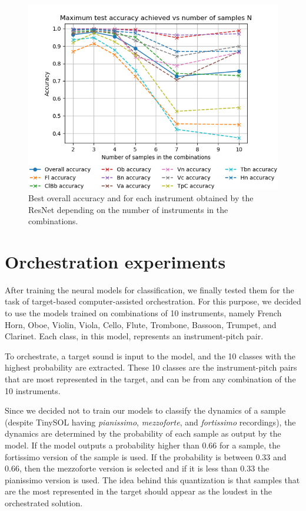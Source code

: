 \documentclass{article}
\begin{document}
\begin{figure}
\begin{center}
\includegraphics[scale=0.40]{figs/Acc_vs_N_ResNet.png}
\caption{Best overall accuracy and for each instrument obtained by the ResNet depending on the number of instruments in the combinations. \label{best_acc_resnet}}
\end{center}
\end{figure}

\section{Orchestration experiments}
\label{sec:orchestration}

After training the neural models for classification, we finally tested them for the task of target-based computer-assisted orchestration. For this purpose, we decided to use the models trained on combinations of 10 instruments, namely French Horn, Oboe, Violin, Viola, Cello, Flute, Trombone, Bassoon, Trumpet, and Clarinet. Each class, in this model, represents an instrument-pitch pair. 

To orchestrate, a target sound is input to the model, and the 10 classes with the highest probability are extracted. These 10 classes are the instrument-pitch pairs that are most represented in the target, and can be from any combination of the 10 instruments. 

Since we decided not to train our models to classify the dynamics of a sample (despite TinySOL having \emph{pianissimo}, \emph{mezzoforte}, and \emph{fortissimo} recordings), the dynamics are determined by the probability of each sample as output by the model. If the model outputs a probability higher than $0.66$ for a sample, the fortissimo version of the sample is used. If the probability is between $0.33$ and $0.66$, then the mezzoforte version is selected and if it is less than $0.33$ the pianissimo version is used. The idea behind this quantization is that samples that are the most represented in the target should appear as the loudest in the orchestrated solution.
\end{document}
